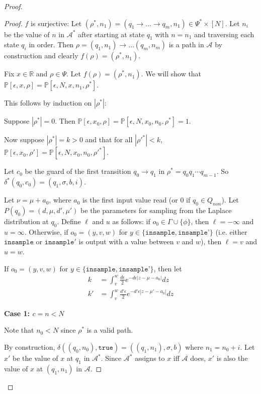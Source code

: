 \documentclass[12pt]{article}
\newcommand{\RR}{\mathbb{R}}
\newcommand{\PP}{\mathbb{P}}
\theoremstyle{definition}
\begin{document}
\begin{proof}
\begin{proof}
	$f$ is surjective: Let $(\rho^*, n_1) = (q_1\to\ldots \to q_m, n_1) \in \Psi^* \times [N]$. Let $n_i$ be the value of $n$ in $\mathcal{A}^*$ after starting at state $q_1$ with $n=n_1$ and traversing each state $q_i$ in order. Then $\rho = (q_1, n_1)\to \ldots (q_m, n_m)$ is a path in $\mathcal{A}$ by construction and clearly $f(\rho) = (\rho^*, n_1)$.

	Fix $x\in \RR$ and $\rho \in \Psi$. Let $f(\rho) = (\rho^*, n_1)$. We will show that $\PP[\epsilon, x, \rho] = \PP[\epsilon, N, x, n_1, \rho^*]$.

	This follows by induction on $|\rho^*|$:

	Suppose $|\rho^*| = 0$. Then $\PP[\epsilon, x_0, \rho] = \PP[\epsilon, N, x_0, n_0, \rho^*] = 1$.

	Now suppose $|\rho^*| = k > 0$ and that for all $|\rho'^{*}|<k$, $\PP[\epsilon, x_0, \rho'] = \PP[\epsilon, N, x_0, n_0, \rho'^{*}]$.

	Let $c_0$ be the guard of the first transition $q_0 \to q_1$ in $\rho^* = q_0q_1\cdots q_{m-1}$. So $\delta^*(q_0, c_0) = (q_1, \sigma, b, i)$.

		
	Let $\nu = \mu + a_0$, where $a_0$ is the first input value read (or 0 if $q_0\in Q_{non}$). Let $P(q_0)= (d, \mu, d', \mu')$ be the parameters for sampling from the Laplace distribution at $q_0$. 
	Define $\ell$ and $u$ as follows: if $o_0 \in \Gamma\cup \{\phi\}$, then $\ell = -\infty$ and $u = \infty$. Otherwise, if $o_0 = (y, v, w)$ for $y \in \{\texttt{insample}, \texttt{insample'}\}$ (i.e. either $\texttt{insample}$ or $\texttt{insample}'$ is output with a value between $v$ and $w$), then $\ell = v$ and $u = w$.
	
	If $o_0 = (y, v, w)$ for $y\in \{\texttt{insample}, \texttt{insample'}\}$, then let \begin{align*}
		k &= \int_{v}^{w}\frac{d\epsilon}{2}e^{-d\epsilon|z-\mu-a_0|}dz\\
		k' &= \int_v^w\frac{d'\epsilon}{2}e^{-d'\epsilon|z-\mu'-a_0|}dz
	\end{align*}

	\textbf{Case 1: $c = n < N$}

	Note that $ n_0 < N$ since $\rho^*$ is a valid path.
	
	By construction, $\delta((q_0, n_0), \texttt{true}) = ((q_1, n_1), \sigma, b)$ where $n_1 = n_0 + i$. Let $x'$ be the value of $x$ at $q_1$ in $\mathcal{A}^*$. Since $\mathcal{A}^*$ assigns to $x$ iff $\mathcal{A}$ does, $x'$ is also the value of $x$ at $(q_1, n_1)$ in $\mathcal{A}$.


\end{proof}
\end{proof}
\end{document}
